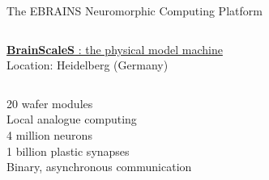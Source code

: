 \begin{myblock1}{\Large The EBRAINS Neuromorphic Computing Platform \phantom{\Huge $\beta$}}


    \vskip13mm

    \vskip6mm
    \begin{columns}[t]
        \begin{column}{0.46\textwidth}
            \begin{flushright}
                \underline{\textbf{BrainScaleS} : the physical model machine}\\[1mm]
                \scriptsize{Location: Heidelberg (Germany)}
            \end{flushright}
            \vskip-8mm
            \begin{columns}[c]
                \begin{column}{0.50\textwidth}
                    \begin{flushright}
                        \small{
                            20 wafer modules\\[2mm]

                            Local analogue computing\\
                            4 million neurons \\
                            1 billion plastic synapses\\[2mm]

                            Binary, asynchronous communication\\[2mm]

}
\end{flushright}
\end{column}
\end{columns}
\end{column}
\end{columns}
\end{myblock1}
